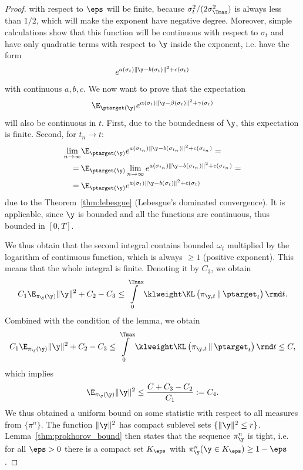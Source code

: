 \begin{proof}
    with respect to $\eps$ will be finite, because $\sigma_t^2 / (2\sigma_{\Tmax}^2)$ is always less than $1/2$, which will make the exponent have negative degree. Moreover, simple calculations show that this function will be continuous with respect to $\sigma_t$ and have only quadratic terms with respect to $\y$ inside the exponent, i.e. have the form
    \begin{equation}
        e^{a(\sigma_t) \|\y - b(\sigma_t)\|^2 + c(\sigma_t)}
    \end{equation}
    with continuous $a, b, c$. We now want to prove that the expectation 
    \begin{equation}
        \E_{\ptarget(\y)}e^{\alpha(\sigma_t) \|\y - \beta(\sigma_t)\|^2 + \gamma(\sigma_t)}
    \end{equation}
    will also be continuous in $t$. First, due to the boundedness of $\y$, this expectation is finite. Second, for $t_n \rightarrow t$:
    \begin{align}
        \lim\limits_{n \rightarrow \infty}&\E_{\ptarget(\y)}e^{a(\sigma_{t_n}) \|\y - b(\sigma_{t_n})\|^2 + c(\sigma_{t_n})} = \\
        = \:&\E_{\ptarget(\y)} \lim\limits_{n \rightarrow \infty} e^{a(\sigma_{t_n}) \|\y - b(\sigma_{t_n})\|^2 + c(\sigma_{t_n})} = \\
        = \:&\E_{\ptarget(\y)} e^{a(\sigma_{t}) \|\y - b(\sigma_{t})\|^2 + c(\sigma_{t})}
    \end{align}
    due to the Theorem~\ref{thm:lebesgue} (Lebesgue's dominated convergence). It is applicable, since $\y$ is bounded and all the functions are continuous, thus bounded in $[0, T]$.

    We thus obtain that the second integral contains bounded $\omega_t$ multiplied by the logarithm of continuous function, which is always $\geq 1$ (positive exponent). This means that the whole integral is finite. Denoting it by $C_3$, we obtain
    \begin{equation}
        C_1 \E_{\pi_{\y}(\y)} \|\y\|^2 + C_2 - C_3\leq \int\limits_{0}^{\Tmax} \klweight \KL\left(\pi_{\y, t} \,\|\, \ptarget_t\right) \rmd t.
    \end{equation}
    Combined with the condition of the lemma, we obtain
    \begin{equation}
        C_1 \E_{\pi_{\y}(\y)} \|\y\|^2 + C_2 - C_3 \leq \int\limits_{0}^{\Tmax} \klweight \KL\left(\pi_{\y, t} \,\|\, \ptarget_t\right) \rmd t  \leq C,
    \end{equation}
    which implies
    \begin{equation}
        \E_{\pi_{\y}(\y)} \|\y\|^2 \leq \frac{C + C_3 - C_2}{C_1} := C_4.
    \end{equation}
    We thus obtained a uniform bound on some statistic with respect to all measures from $\{\pi^n\}$. The function $\|\y\|^2$ has compact sublevel sets $\{ \|\y\|^2 \leq r\}$. Lemma~\ref{thm:prokhorov_bound} then states that the sequence $\pi^{n}_{\y}$ is tight, i.e. for all $\eps > 0$ there is a compact set $K_\eps$ with $\pi^{n}_{\y}(\y \in K_\eps) \geq 1 - \eps$. 


\end{proof}
